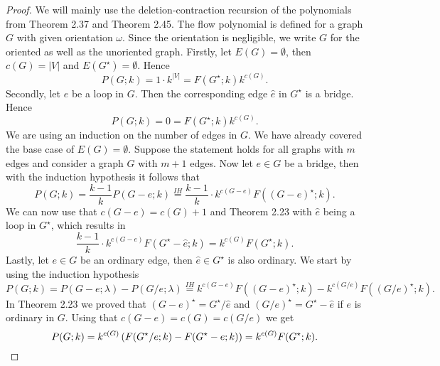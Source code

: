 \documentclass[12pt,a4paper, twoside, autooneside=false]{scrartcl}
\theoremstyle{definition}
\theoremstyle{remark}
\numberwithin{equation}{section}
\begin{document}
\begin{proof}
We will mainly use the deletion-contraction recursion of the polynomials from Theorem 2.37 and Theorem 2.45. The flow polynomial is defined for a graph $G$ with given orientation $\omega$. Since the orientation is negligible, we write $G$ for the oriented as well as the unoriented graph. Firstly, let $E(G) = \emptyset$, then $c(G) = |V|$ and $E(G^\star) = \emptyset$. Hence 
\[
P(G; k) = 1 \cdot k^{|V|} = F(G^\star; k) k^{c(G)}.
\]
Secondly, let $e$ be a loop in $G$. Then the corresponding edge $\hat{e}$ in $G^\star$ is a bridge. Hence 
\[
P(G; k) = 0 = F(G^\star;k) k^{c(G)}.
\]
We are using an induction on the number of edges in $G$. We have already covered the base case of $E(G) = \emptyset$. Suppose the statement holds for all graphs with $m$ edges and consider a graph $G$ with $m + 1$ edges. Now let $e \in G$ be a bridge, then with the induction hypothesis it follows that 
\[
P(G; k) = \frac{k - 1}{k} P(G - e; k) \overset{IH}{=} \frac{k - 1}{k} \cdot k^{c(G - e)} F((G - e)^\star;k).
\]
We can now use that $c(G - e) = c(G) + 1$ and Theorem 2.23 with $\hat{e}$ being a loop in $G^\star$, which results in
\[
\frac{k - 1}{k} \cdot k^{c(G - e)} F(G^\star - \hat{e};k) = k^{c(G)} F(G^\star;k).
\]
Lastly, let $e \in G$ be an ordinary edge, then $\hat{e} \in G^\star$ is also ordinary. We start by using the induction hypothesis
\[
P(G;k) = P(G - e; \lambda) - P(G / e; \lambda) \overset{IH}{=} k^{c(G - e)} F((G - e)^\star;k) - k^{c(G / e)}F((G / e)^\star;k).
\]
In Theorem 2.23 we proved that $(G - e)^\star = G^\star / \hat{e}$ and $(G / e)^\star = G^\star - \hat{e}$ if $e$ is ordinary in $G$. Using that $c(G - e) = c(G) = c(G / e)$ we get
\[
P(G;k) = k^{c(G)}\left(F(G^\star / e;k) - F(G^\star - e;k)\right) = k^{c(G)}F(G^\star; k).\qedhere
\]
\end{proof}
\end{document}
